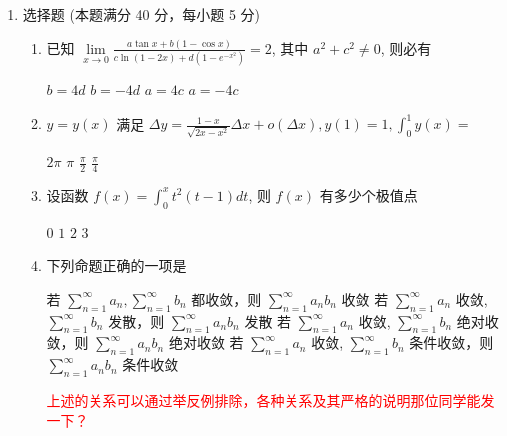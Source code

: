 
\begin{enumerate}
	\item
	选择题 (本题满分 40 分，每小题 5 分)
	
\begin{enumerate}
\item
已知 $\lim\limits _{x \rightarrow 0} \frac{a \tan x+b(1-\cos x)}{c \ln (1-2 x)+d\left(1-e^{-x^{2}}\right)}=2$, 其中 $a^{2}+c^{2}\neq 0$, 则必有 

	
\fourchoices
{$b=4 d$}
{$b=-4 d$}
{$a=4 c$}
{$a=-4 c$}

\item 
$y=y(x)$ 满足 $\Delta y=\frac{1-x}{\sqrt{2 x-x^{2}}} \Delta x+o(\Delta x), y(1)=1, \int_{0}^{1} y(x)=$  


\fourchoices
{$2 \pi$}
{$\pi$}
{$\frac{\pi}{2}$}
{$\frac{\pi}{4}$}

\item 
设函数 $f(x)=\int_{0}^{x} t^{2}(t-1) d t$, 则 $f(x)$ 有多少个极值点  


\fourchoices
{$ 0 $}
{$ 1 $}
{$ 2 $}
{$ 3 $}


\item 
下列命题正确的一项是  


\fourchoices
{若 $\sum\limits_{n=1}^{\infty} a_{n}, \sum\limits_{n=1}^{\infty} b_{n}$ 都收敛，则 $\sum\limits_{n=1}^{\infty} a_{n} b_{n}$ 收敛}
{若 $\sum\limits_{n=1}^{\infty} a_{n}$ 收敛, $\sum\limits_{n=1}^{\infty} b_{n}$ 发散，则 $\sum\limits_{n=1}^{\infty} a_{n} b_{n}$ 发散}
{若 $\sum\limits_{n=1}^{\infty} a_{n}$ 收敛, $\sum\limits_{n=1}^{\infty} b_{n}$ 绝对收敛，则 $\sum\limits_{n=1}^{\infty} a_{n} b_{n}$ 绝对收敛}
{若 $\sum\limits_{n=1}^{\infty} a_{n}$ 收敛, $\sum\limits_{n=1}^{\infty} b_{n}$ 条件收敛，则 $\sum\limits_{n=1}^{\infty} a_{n} b_{n}$ 条件收敛}

\begin{note}
	\textcolor{red}{上述的关系可以通过举反例排除，各种关系及其严格的说明那位同学能发一下？}
\end{note}



\end{enumerate}
\end{enumerate}
